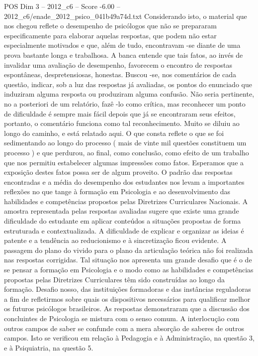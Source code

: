 \begin{textsample}{POS Dim 3 – 2012\_c6 – Score -6.00 – 2012\_c6/enade\_2012\_psico\_041b49a74d.txt}
Considerando isto, o material que nos chegou reflete o desempenho de psicólogos que não se prepararam especificamente para elaborar aquelas respostas, que podem não estar especialmente motivados e que, além de tudo, encontravam -se diante de uma prova bastante longa e trabalhosa.
A banca entende que tais fatos, ao invés de invalidar uma avaliação de desempenho, favorecem o encontro de respostas espontâneas, despretensiosas, honestas.
Buscou -se, nos comentários de cada questão, indicar, sob a luz das respostas já avaliadas, os pontos do enunciado que induziram alguma resposta ou produziram alguma confusão.
Não seria pertinente, no a posteriori de um relatório, fazê -lo como crítica, mas reconhecer um ponto de dificuldade é sempre mais fácil depois que já se encontraram seus efeitos, portanto, o comentário funciona como tal reconhecimento.
Muito se diluiu ao longo do caminho, e está relatado aqui.
O que consta reflete o que se foi sedimentando ao longo do processo ( mais de vinte mil questões constituem um processo ) e que perdurou, ao final, como conclusão, como efeito de um trabalho que nos permitiu estabelecer algumas impressões como fatos.
Esperamos que a exposição destes fatos possa ser de algum proveito.
O padrão das respostas encontradas e a média do desempenho dos estudantes nos levam a importantes reflexões no que tange à formação em Psicologia e ao desenvolvimento das habilidades e competências propostos pelas Diretrizes Curriculares Nacionais.
A amostra representada pelas respostas avaliadas sugere que existe uma grande dificuldade do estudante em aplicar conteúdos a situações propostas de forma estruturada e contextualizada.
A dificuldade de explicar e organizar as ideias é patente e a tendência ao reducionismo e à sincretização ficou evidente.
A passagem do plano do vivido para o plano da articulação teórica não foi realizada nas respostas corrigidas.
Tal situação nos apresenta um grande desafio que é o de se pensar a formação em Psicologia e o modo como as habilidades e competências propostas pelas Diretrizes Curriculares têm sido construídas ao longo da formação.
Desafio nosso, das instituições formadoras e das instâncias reguladoras a fim de refletirmos sobre quais os dispositivos necessários para qualificar melhor os futuros psicólogos brasileiros.
As respostas demonstraram que a discussão dos concluintes de Psicologia se mistura com o senso comum.
A interlocução com outros campos de saber se confunde com a mera absorção de saberes de outros campos.
Isto se verificou em relação à Pedagogia e à Administração, na questão 3, e à Psiquiatria, na questão 5.

\end{textsample}
